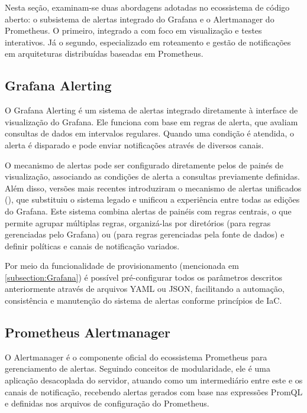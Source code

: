 Nesta seção, examinam-se duas abordagens adotadas no ecossistema de código aberto: o subsistema de alertas integrado do Grafana e o Alertmanager do Prometheus. O primeiro, integrado a  com foco em visualização e testes interativos. Já o segundo, especializado em roteamento e gestão de notificações em arquiteturas distribuídas baseadas em Prometheus.

\subsection{Grafana Alerting}
\label{subsection:GrafanaAlerting}

O Grafana Alerting \citep{grafanaalerting2025} é um sistema de alertas integrado diretamente à interface de visualização do Grafana. Ele funciona com base em regras de alerta, que avaliam consultas de dados em intervalos regulares. Quando uma condição é atendida, o alerta é disparado e pode enviar notificações através de diversos canais.

O mecanismo de alertas pode ser configurado diretamente pelos de painés de visualização, associando as condições de alerta a consultas previamente definidas. Além disso, versões mais recentes introduziram o mecanismo de alertas unificados (), que substituiu o sistema legado e unificou a experiência entre todas as edições do Grafana. Este sistema combina alertas de painéis com regras centrais, o que permite agrupar múltiplas regras, organizá-las por diretórios (para regras gerenciadas pelo Grafana) ou  (para regras gerenciadas pela fonte de dados) e definir políticas e canais de notificação variados.

Por meio da funcionalidade de provisionamento (mencionada em \ref{subsection:Grafana}) é possível pré-configurar todos os parâmetros descritos anteriormente através de arquivos YAML ou JSON, facilitando a automação, consistência e manutenção do sistema de alertas conforme princípios de IaC.

\subsection{Prometheus Alertmanager}
\label{subsection:PrometheusAlertmanager}

O Alertmanager \citep{promalertmanager2025}
é o componente oficial do ecossistema Prometheus para gerenciamento de alertas. Seguindo conceitos de modularidade, ele é uma aplicação desacoplada do servidor, atuando como um intermediário entre este e os canais de notificação, recebendo alertas gerados com base nas expressões PromQL e definidas nos arquivos de configuração do Prometheus.

